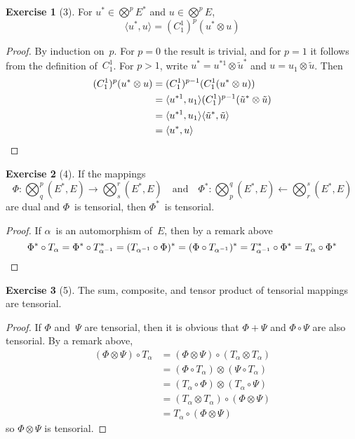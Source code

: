 \documentclass[letterpaper,12pt]{article}
\newcommand{\from}{\leftarrow}
\newcommand{\after}{\circ}
\newcommand{\tprod}{\otimes}
\newcommand{\bigtprod}{\bigotimes}
\newcommand{\medtprod}{{\textstyle\bigtprod}}
\newcommand{\sprod}[2]{\langle#1,#2\rangle}
\theoremstyle{definition}
\newtheorem*{exer}{Exercise}
\theoremstyle{remark}
\begin{document}
\begin{exer}[3]
For \(u^*\in\medtprod^p E^*\) and \(u\in\medtprod^p E\),
\[\sprod{u^*}{u}=(C^1_1)^p(u^*\tprod u)\]
\end{exer}
\begin{proof}
By induction on~\(p\). For \(p=0\) the result is trivial, and for \(p=1\) it follows from the definition of~\(C^1_1\). For \(p>1\), write \(u^*=u^{*1}\tprod\tilde{u}^*\) and \(u=u_1\tprod\tilde{u}\). Then
\begin{align*}
(C^1_1)^p(u^*\tprod u)&=(C^1_1)^{p-1}(C^1_1(u^*\tprod u))\\
	&=\sprod{u^{*1}}{u_1}(C^1_1)^{p-1}(\tilde{u}^*\tprod\tilde{u})\\
	&=\sprod{u^{*1}}{u_1}\sprod{\tilde{u}^*}{\tilde{u}}\\
	&=\sprod{u^*}{u}\qedhere
\end{align*}
\end{proof}

\begin{exer}[4]
If the mappings
\[\Phi:\medtprod^p_q(E^*,E)\to\medtprod^r_s(E^*,E)\quad\text{and}\quad\Phi^*:\medtprod^q_p(E^*,E)\from\medtprod^s_r(E^*,E)\]
are dual and \(\Phi\)~is tensorial, then \(\Phi^*\)~is tensorial.
\end{exer}
\begin{proof}
If \(\alpha\)~is an automorphism of~\(E\), then by a remark above
\[\Phi^*\after T_{\alpha}=\Phi^*\after T_{\alpha^{-1}}^*=(T_{\alpha^{-1}}\after\Phi)^*=(\Phi\after T_{\alpha^{-1}})^*=T_{\alpha^{-1}}^*\after\Phi^*=T_{\alpha}\after\Phi^*\qedhere\]
\end{proof}

\begin{exer}[5]
The sum, composite, and tensor product of tensorial mappings are tensorial.
\end{exer}
\begin{proof}
If \(\Phi\) and~\(\Psi\) are tensorial, then it is obvious that \(\Phi+\Psi\) and \(\Phi\after\Psi\) are also tensorial. By a remark above,
\begin{align*}
(\Phi\tprod\Psi)\after T_{\alpha}&=(\Phi\tprod\Psi)\after(T_{\alpha}\tprod T_{\alpha})\\
	&=(\Phi\after T_{\alpha})\tprod(\Psi\after T_{\alpha})\\
	&=(T_{\alpha}\after\Phi)\tprod(T_{\alpha}\after\Psi)\\
	&=(T_{\alpha}\tprod T_{\alpha})\after(\Phi\tprod\Psi)\\
	&=T_{\alpha}\after(\Phi\tprod\Psi)
\end{align*}
so \(\Phi\tprod\Psi\) is tensorial.
\end{proof}
\end{document}
